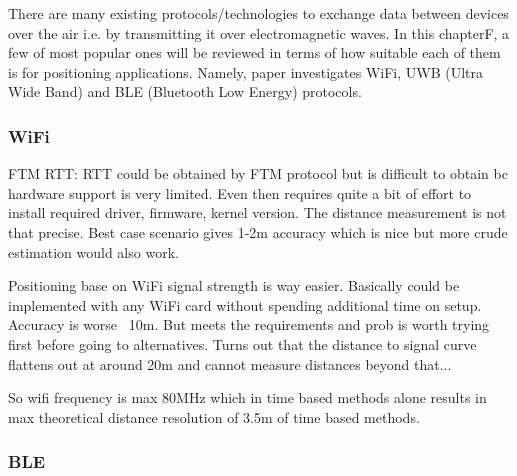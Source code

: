 There are many existing protocols/technologies to exchange data between devices over the air i.e. by transmitting it over electromagnetic waves. In this chapterF, a few of most popular ones will be reviewed in terms of how suitable each of them is for positioning applications. Namely, paper investigates WiFi, UWB (Ultra Wide Band) and BLE (Bluetooth Low Energy) protocols.

\subsubsection{WiFi}

FTM RTT: RTT could be obtained by FTM protocol but is difficult to obtain bc hardware support is very limited. Even then requires quite a bit of effort to install required driver, firmware, kernel version. The distance measurement is not that precise. Best case scenario gives 1-2m accuracy which is nice but more crude estimation would also work.

Positioning base on WiFi signal strength is way easier. Basically could be implemented with any WiFi card without spending additional time on setup. Accuracy is worse ~10m. But meets the requirements and prob is worth trying first before going to alternatives. Turns out that the distance to signal curve flattens out at around 20m and cannot measure distances beyond that...

So wifi frequency is max 80MHz which in time based methods alone results in max theoretical distance resolution of 3.5m of time based methods.



\subsubsection{BLE}

